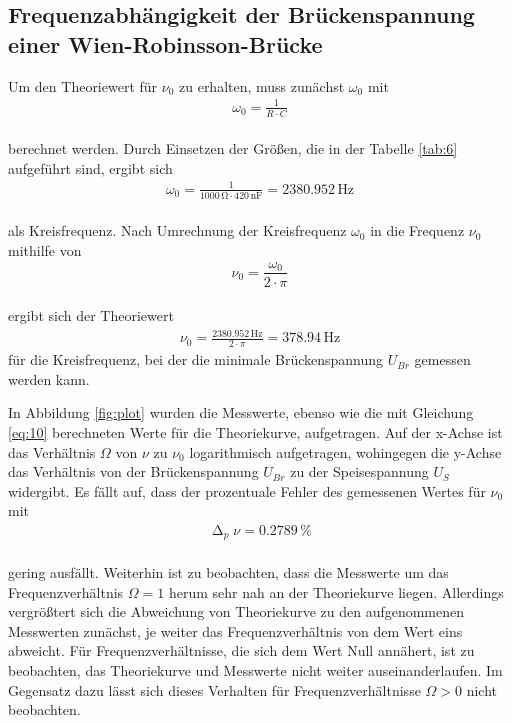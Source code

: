 \subsection{Frequenzabhängigkeit der Brückenspannung einer Wien-Robinsson-Brücke}

Um den Theoriewert für $\nu_{0}$ zu erhalten, muss zunächst $\omega_{0}$ mit 
\begin{align}
\omega_{0} = \frac{1}{R \cdot C} \nonumber
\end{align}
\\ 
berechnet werden. Durch Einsetzen der Größen, die in der Tabelle \ref{tab:6} 
aufgeführt sind, ergibt sich
\begin{align}
\omega_{0} = \frac{1}{1000\, \si{\ohm} \cdot 420\, \si{\nano\farad}} = 2380.952\, \si{\hertz}
\end{align}
\\ 
als Kreisfrequenz. Nach Umrechnung der Kreisfrequenz $\omega_{0}$ in die Frequenz $\nu_{0}$ mithilfe von 
\begin{equation}
\nu_{0} = \frac{\omega_{0}}{2 \cdot \pi}
\end{equation}
\\
ergibt sich der Theoriewert 
\begin{align}
\nu_{0} = \frac{2380.952\, \si{\hertz}}{2 \cdot \pi} = 378.94\, \si{\hertz}
\end{align}
für die Kreisfrequenz, bei der die minimale Brückenspannung $U_{Br}$ gemessen werden kann.

In Abbildung \ref{fig:plot} wurden die Messwerte, ebenso wie die mit Gleichung \ref{eq:10}
berechneten Werte für die Theoriekurve, aufgetragen. Auf der x-Achse ist das Verhältnis $\Omega$ von $\nu$ zu $\nu_{0}$
logarithmisch aufgetragen, wohingegen die y-Achse das Verhältnis von der Brückenspannung $U_{Br}$ zu der Speisespannung
$U_{S}$ widergibt.
Es fällt auf, dass der prozentuale Fehler des gemessenen Wertes für $\nu_{0}$ mit 
\begin{align}
\upDelta_{p} \nu = 0.2789\, \% \nonumber
\end{align}
\\
gering ausfällt. Weiterhin ist zu beobachten, dass die Messwerte um das Frequenzverhältnis $\Omega = 1$
herum sehr nah an der Theoriekurve liegen. Allerdings vergrößtert sich die Abweichung von Theoriekurve zu den aufgenommenen
Messwerten zunächst, je weiter das Frequenzverhältnis von dem Wert eins abweicht. Für Frequenzverhältnisse, die sich dem Wert Null
annähert, ist zu beobachten, das Theoriekurve und Messwerte nicht weiter auseinanderlaufen. Im Gegensatz dazu lässt sich 
dieses Verhalten für Frequenzverhältnisse $\Omega > 0$ nicht beobachten.


